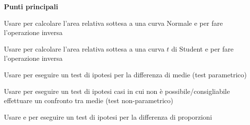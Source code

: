 \vspace{0.5cm}

\begin{tcolorbox}[width=1\linewidth, halign=left, colframe=blue!60, colback=white, boxsep=1mm, arc=3mm]

\textbf{Punti principali}

\begin{myitemize}
    \item Usare  per calcolare l'area relativa sottesa a una curva Normale e  per fare l'operazione inversa
    \item Usare  per calcolare l'area relativa sottesa a una curva $t$ di Student e  per fare l'operazione inversa
	\item Usare  per eseguire un test di ipotesi per la differenza di medie (test parametrico)
	\item Usare  per eseguire un test di ipotesi casi in cui non \`e possibile/consigliabile effettuare un confronto tra medie (test non-parametrico)
    \item Usare  e  per eseguire un test di ipotesi per la differenza di proporzioni 
\end{myitemize}

\end{tcolorbox}

